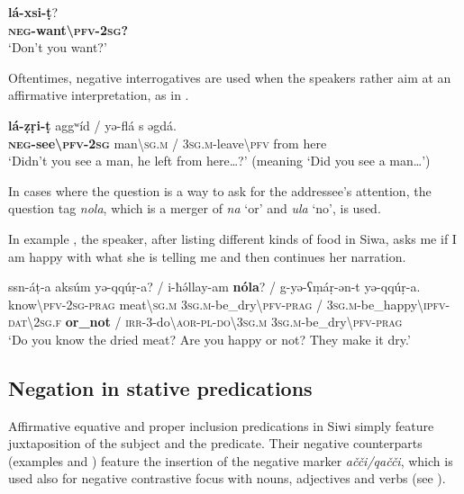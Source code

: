 \documentclass[output=paper,colorlinks,citecolor=brown]{langscibook}
\begin{document}
    \ex\label{ex:siw:16b}
        \gll \textbf{l\'{a}-xsi-ṭ}? \\
             \textbf{\textsc{neg-}want{\textbackslash}\textsc{pfv-2sg}?}\\
        \glt ‘Don’t you want?’
    \z
\z 

Oftentimes, negative interrogatives are used when the speakers rather aim at an affirmative interpretation, as in .

\ea\label{ex:siw:17}
    \gll \textbf{lá-ẓṛi-ṭ} aggʷíd / yə-flá s əgdá. \\
         \textbf{\textsc{neg}{}-see{\textbackslash}\textsc{pfv-2sg}} man{\textbackslash}\textsc{sg.m} /  \textsc{3sg.m-}leave{\textbackslash}\textsc{pfv} from here \\
    \glt ‘Didn’t you see a man, he left from here…?’ (meaning ‘Did you see a man…’)
\z

In cases where the question is a way to ask for the addressee’s attention, the question tag \textit{nola}, which is a merger of \textit{na} ‘or’ and \textit{ula} ‘no’, is used.

In example , the speaker, after listing different kinds of food in Siwa, asks me if I am happy with what she is telling me and then continues her narration.

\ea\label{ex:siw:18}
    \gll ssn-\'{a}ṭ-a aksúm yə-qqúṛ-a? / i-ħə́llay-am \textbf{nóla}? / g-yə-ʕṃáṛ-ən-t yə-qqúṛ-a. \\
         know{\textbackslash}\textsc{pfv-2sg-prag} meat{\textbackslash}\textsc{sg.m} \textsc{3sg.m-}be\_dry{\textbackslash}\textsc{pfv-prag} / \textsc{3sg.m}{}-be\_happy{\textbackslash}\textsc{ipfv-dat\textbackslash2sg.f} \textbf{or\_not} / \textsc{irr-3-}do{\textbackslash}\textsc{aor-pl-do\textbackslash3sg.m} \textsc{3sg.m}{}-be\_dry{\textbackslash}\textsc{pfv-prag}\\
    \glt ‘Do you know the dried meat? Are you happy or not? They make it dry.’
\z


\subsection{Negation in stative predications}\label{sec:siw:2.3}

Affirmative equative and proper inclusion predications in Siwi simply feature juxtaposition of the subject and the predicate. Their negative counterparts (examples  and ) feature the insertion of the negative marker \textit{ačči/qačči}, which is used also for negative contrastive focus with nouns, adjectives and verbs (see ).
\end{document}
